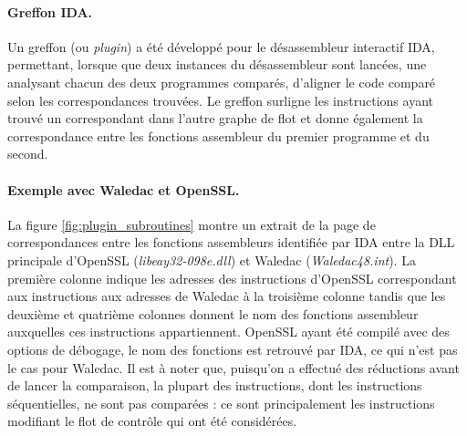 \paragraph{Greffon IDA.}
Un greffon (ou \emph{plugin}) a été développé pour le désassembleur interactif IDA, permettant, lorsque que deux instances du désassembleur sont lancées, une analysant chacun des deux programmes comparés, d'aligner le code comparé selon les correspondances trouvées.
Le greffon surligne les instructions ayant trouvé un correspondant dans l'autre graphe de flot et donne également la correspondance entre les fonctions assembleur du premier programme et du second.

\paragraph{Exemple avec Waledac et OpenSSL.}
La figure \ref{fig:plugin_subroutines} montre un extrait de la page de correspondances entre les fonctions assembleurs identifiée par IDA entre la DLL principale d'OpenSSL (\emph{libeay32-098e.dll}) et Waledac (\emph{Waledac48.int}). La première colonne indique les adresses des instructions d'OpenSSL correspondant aux instructions aux adresses de Waledac à la troisième colonne tandis que les deuxième et quatrième colonnes donnent le nom des fonctions assembleur auxquelles ces instructions appartiennent.
OpenSSL ayant été compilé avec des options de débogage, le nom des fonctions est retrouvé par IDA, ce qui n'est pas le cas pour Waledac.
Il est à noter que, puisqu'on a effectué des réductions avant de lancer la comparaison, la plupart des instructions, dont les instructions séquentielles, ne sont pas comparées : ce sont principalement les instructions modifiant le flot de contrôle qui ont été considérées.


